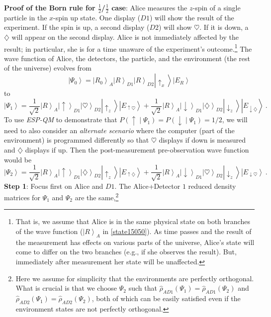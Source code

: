 \documentclass[12pt,onecolumn,secnumarabic,amsmath,amssymb,balancelastpage,nofootinbib]{article}
\newcommand{\ket}[1]{\ensuremath{\left|#1\right\rangle}}
\begin{document}
\textbf{Proof of the Born rule for $\frac{1}{2}$/$\frac{1}{2}$ case}: Alice measures the $z$-spin of a single particle in the $x$-spin up state.  One display ($D1$) will show the result of the experiment.  If the spin is up, a second display ($D2$) will show $\heartsuit$.  If it is down, a $\diamondsuit$ will appear on the second display.  Alice is not immediately affected by the result; in particular, she is for a time unaware of the experiment's outcome.\footnote{That is, we assume that Alice is in the same physical state on both branches of the wave function ($\ket{R}_A$ in \eqref{state15050}).  As time passes and the result of the measurement has effects on various parts of the universe, Alice's state will come to differ on the two branches (e.g., if she observes the result).  But, immediately after measurement her state will be unaffected.} The wave function of Alice, the detectors, the particle, and the environment (the rest of the universe) evolves from
\begin{equation}
\ket{\Psi_0}=\ket{R_0}_A\ket{R}_{D1}\ket{R}_{D2}\ket{\uparrow_x}\ket{E_R}
\end{equation}
to
\begin{equation}
\ket{\Psi_1}=\frac{1}{\sqrt{2}}\ket{R}_A\ket{\uparrow}_{D1}\ket{\heartsuit}_{D2}\ket{\uparrow_z}\ket{E_{\uparrow \heartsuit}}+\frac{1}{\sqrt{2}}\ket{R}_A\ket{\downarrow}_{D1}\ket{\diamondsuit}_{D2}\ket{\downarrow_z}\ket{E_{\downarrow\diamondsuit}}\ .
\label{state15050}
\end{equation}
To use \emph{ESP-QM} to demonstrate that $P\left(\uparrow\middle|\Psi_1\right)=P\left(\downarrow\middle|\Psi_1\right)=1/2$, we will need to also consider an \textit{alternate scenario} where the computer (part of the environment) is programmed differently so that $\heartsuit$ displays if down is measured and $\diamondsuit$ displays if up.  Then the post-measurement pre-observation wave function would be
\begin{equation}
\ket{\Psi_2}=\frac{1}{\sqrt{2}}\ket{R}_A\ket{\uparrow}_{D1}\ket{\diamondsuit}_{D2}\ket{\uparrow_z}\ket{E_{\uparrow \diamondsuit}}+\frac{1}{\sqrt{2}}\ket{R}_A\ket{\downarrow}_{D1}\ket{\heartsuit}_{D2}\ket{\downarrow_z}\ket{E_{\downarrow \heartsuit}}\ .
\label{state25050}
\end{equation}
\textbf{Step 1}:  Focus first on Alice and $D1$.  The Alice+Detector $1$ reduced density matrices for $\Psi_1$ and $\Psi_2$ are the same,\footnote{Here we assume for simplicity that the environments are perfectly orthogonal.  What is crucial is that we choose $\Psi_2$ such that $\widehat{\rho}_{AD1}\left(\Psi_1\right)=\widehat{\rho}_{AD1}\left(\Psi_2\right)$ and $\widehat{\rho}_{AD2}\left(\Psi_1\right)=\widehat{\rho}_{AD2}\left(\Psi_2\right)$, both of which can be easily satisfied even if the environment states are not perfectly orthogonal.}
\end{document}
